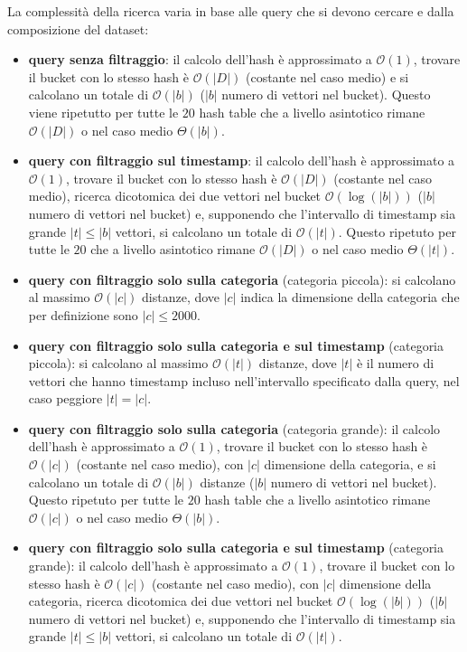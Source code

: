 La complessità della ricerca varia in base alle query che si devono cercare e dalla 
composizione del dataset:
\begin{itemize}
    \item \textbf{query senza filtraggio}: il calcolo dell'hash è approssimato a $\mathcal{O}(1)$,
    trovare il bucket con lo stesso hash è $\mathcal{O}(|D|)$ (costante nel caso medio) e 
    si calcolano un totale di $\mathcal{O}(|b|)$ ($|b|$ numero di vettori nel bucket). 
    Questo viene ripetutto per tutte le $20$ hash table che a livello asintotico rimane $\mathcal{O}(|D|)$
    o nel caso medio $\Theta(|b|)$.
    \item \textbf{query con filtraggio sul timestamp}: il calcolo dell'hash è approssimato a $\mathcal{O}(1)$,
    trovare il bucket con lo stesso hash è $\mathcal{O}(|D|)$ (costante nel caso medio),
    ricerca dicotomica dei due vettori nel bucket $\mathcal{O}(\log(|b|))$ ($|b|$ numero di vettori nel bucket) 
    e, supponendo che l'intervallo di timestamp sia grande $|t|\le |b|$ vettori, 
    si calcolano un totale di $\mathcal{O}(|t|)$. 
    Questo ripetuto per tutte le $20$ che a livello asintotico rimane $\mathcal{O}(|D|)$
    o nel caso medio $\Theta(|t|)$.
    \item \textbf{query con filtraggio solo sulla categoria} (categoria piccola): 
    si calcolano al massimo $\mathcal{O}(|c|)$ distanze, dove $|c|$ indica la dimensione 
    della categoria che per definizione sono $|c|\le 2000$.
    \item \textbf{query con filtraggio solo sulla categoria e sul timestamp} (categoria piccola): 
    si calcolano al massimo $\mathcal{O}(|t|)$ distanze, dove $|t|$ è il numero 
    di vettori che hanno timestamp incluso nell'intervallo specificato dalla query,
    nel caso peggiore $|t|=|c|$. 
    \item \textbf{query con filtraggio solo sulla categoria} (categoria grande):
    il calcolo dell'hash è approssimato a $\mathcal{O}(1)$,
    trovare il bucket con lo stesso hash è $\mathcal{O}(|c|)$ (costante nel caso medio), con
    $|c|$ dimensione della categoria, e 
    si calcolano un totale di $\mathcal{O}(|b|)$ distanze ($|b|$ numero di vettori nel bucket).
    Questo ripetuto per tutte le $20$ hash table che a livello asintotico rimane $\mathcal{O}(|c|)$
    o nel caso medio $\Theta(|b|)$.
    \item \textbf{query con filtraggio solo sulla categoria e sul timestamp} (categoria grande): 
    il calcolo dell'hash è approssimato a $\mathcal{O}(1)$,
    trovare il bucket con lo stesso hash è $\mathcal{O}(|c|)$ (costante nel caso medio), con
    $|c|$ dimensione della categoria, 
    ricerca dicotomica dei due vettori nel bucket $\mathcal{O}(\log(|b|))$ ($|b|$ numero di vettori nel bucket) 
    e, supponendo che l'intervallo di timestamp sia grande $|t|\le |b|$ vettori, 
    si calcolano un totale di $\mathcal{O}(|t|)$.
\end{itemize}


